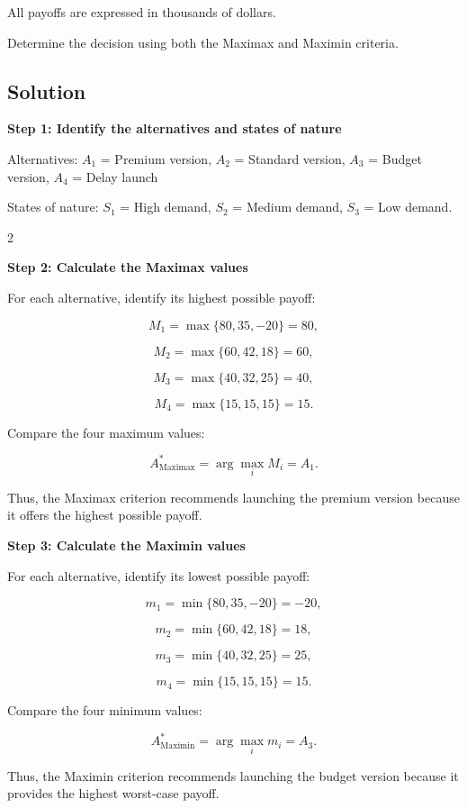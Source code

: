 	All payoffs are expressed in thousands of dollars.
	
	Determine the decision using both the Maximax and Maximin criteria.
	
	
	\subsection{Solution}
	
	\textbf{Step 1: Identify the alternatives and states of nature}
	
	Alternatives: $A_1$ = Premium version, $A_2$ = Standard version,
	$A_3$ = Budget version, $A_4$ = Delay launch
	
	\qquad
	
	States of nature: $S_1$ = High demand, $S_2$ = Medium demand,
	$S_3$ = Low demand.
	
	\noindent
	\setlength{\columnseprule}{0.4pt}
	
	\begin{multicols}{2}
		\vspace{0pt}
		
		\textbf{Step 2: Calculate the Maximax values}
		
		For each alternative, identify its highest possible payoff:
		
		\[
		M_1
		=
		\max\{80,35,-20\}
		=
		80,
		\]
		
		\[
		M_2
		=
		\max\{60,42,18\}
		=
		60,
		\]
		
		\[
		M_3
		=
		\max\{40,32,25\}
		=
		40,
		\]
		
		\[
		M_4
		=
		\max\{15,15,15\}
		=
		15.
		\]
		
		Compare the four maximum values:
		
		\[
		A^*_{\mathrm{Maximax}}
		=
		\arg\max_i M_i
		=
		A_1.
		\]
		
		Thus, the Maximax criterion recommends launching the premium version because it offers the highest possible payoff.
		
		\columnbreak
		
		\textbf{Step 3: Calculate the Maximin values}
		
		For each alternative, identify its lowest possible payoff:
		
		\[
		m_1
		=
		\min\{80,35,-20\}
		=
		-20,
		\]
		
		\[
		m_2
		=
		\min\{60,42,18\}
		=
		18,
		\]
		
		\[
		m_3
		=
		\min\{40,32,25\}
		=
		25,
		\]
		
		\[
		m_4
		=
		\min\{15,15,15\}
		=
		15.
		\]
		
		Compare the four minimum values:
		
		\[
		A^*_{\mathrm{Maximin}}
		=
		\arg\max_i m_i
		=
		A_3.
		\]
		
		Thus, the Maximin criterion recommends launching the budget version because it provides the highest worst-case payoff.
		
	\end{multicols}
	
